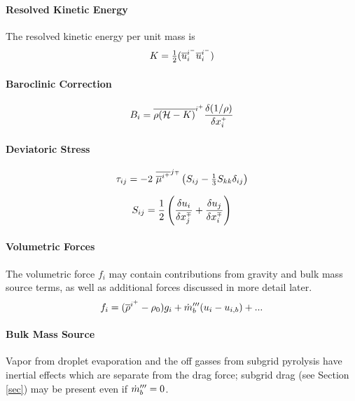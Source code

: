 \documentclass[11pt]{article}
\begin{document}
\paragraph{Resolved Kinetic Energy} The resolved kinetic energy per unit mass is
\begin{equation}
\label{eqn_ke}
K = \mbox{$\frac{1}{2}$} ( \overline{u}_i^{i^-}\overline{u}_i^{i^-} )
\end{equation}

\paragraph{Baroclinic Correction}
\begin{equation}
B_i = \overline{\rho({\cal H} - K)}^{i^{\scriptscriptstyle +}} \frac{\delta (1/\rho)}{\delta x_i^{\scriptscriptstyle +}}
\end{equation}

\paragraph{Deviatoric Stress}

\begin{equation}
\label{eqn_deviatoric_stress}
\tau_{ij} = -2 \,\,\overline{\overline{\mu}^{i^+}}^{j{\scriptscriptstyle \mp}} \left( S_{ij} - \mbox{$\frac{1}{3}$} S_{kk} \delta_{ij} \right)
\end{equation}

\begin{equation}
\label{eqn_strain_tensor}
S_{ij} = \frac{1}{2}\left( \frac{\delta u_i}{\delta x_j^{\scriptscriptstyle \mp}} + \frac{\delta u_j}{\delta x_i^{\scriptscriptstyle \mp}} \right)
\end{equation}

\paragraph{Volumetric Forces} The volumetric force $f_i$ may contain contributions from gravity and bulk mass source terms, as well as additional forces discussed in more detail later.
\begin{equation}
f_i = (\overline{\rho}^{i^+}-\rho_0)g_i + \dot{m}_b^{\prime\prime\prime}(u_i-u_{i,b}) + ...
\end{equation}

\paragraph{Bulk Mass Source} Vapor from droplet evaporation and the off gasses from subgrid pyrolysis have inertial effects which are separate from the drag force; subgrid drag (see Section \ref{sec}) may be present even if $\dot{m}_b^{\prime\prime\prime}=0$.
\end{document}
